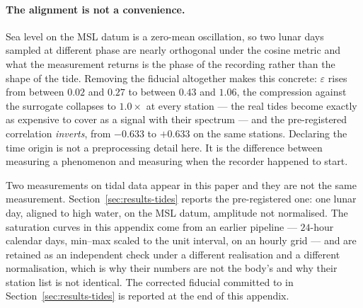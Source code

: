 \documentclass[10pt]{article}
\theoremstyle{plain}
\theoremstyle{definition}
\theoremstyle{remark}
\begin{document}
\paragraph{The alignment is not a convenience.}
Sea level on the MSL datum is a zero-mean oscillation, so two lunar days sampled
at different phase are nearly orthogonal under the cosine metric and what the
measurement returns is the phase of the recording rather than the shape of the
tide. Removing the fiducial altogether makes this concrete: $\varepsilon$ rises
from between $0.02$ and $0.27$ to between $0.43$ and $1.06$, the compression
against the surrogate collapses to $1.0\times$ at every station --- the real
tides become exactly as expensive to cover as a signal with their spectrum ---
and the pre-registered correlation \emph{inverts}, from $-0.633$ to $+0.633$ on
the same stations. Declaring the time origin is not a preprocessing detail
here. It is the difference between measuring a phenomenon and measuring when the
recorder happened to start.



\label{app:noaa_multisite}

Two measurements on tidal data appear in this paper and they are not the same
measurement. Section~\ref{sec:results-tides} reports the pre-registered one: one
lunar day, aligned to high water, on the MSL datum, amplitude not normalised.
The saturation curves in this appendix come from an earlier pipeline --- $24$-hour
calendar days, min--max scaled to the unit interval, on an hourly grid --- and
are retained as an independent check under a different realisation and a
different normalisation, which is why their numbers are not the body's and why
their station list is not identical. The corrected fiducial committed to in
Section~\ref{sec:results-tides} is reported at the end of this appendix.
\end{document}
